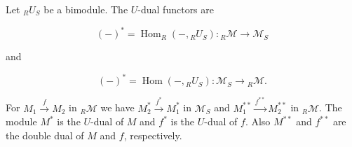 Let ${}_R U_S$ be a bimodule. The $U$-dual functors are

$$(-)^* = \operatorname{Hom}_R(-, {}_R U_S): {}_R\mathcal{M} \to \mathcal{M}_S$$

and

$$(-)^* = \operatorname{Hom}(-, {}_R U_S): \mathcal{M}_S \to {}_R\mathcal{M}.$$

For $M_1 \xrightarrow{f} M_2$ in ${}_R\mathcal{M}$ we have $M_2^* \xrightarrow{f^*} M_1^*$ in $\mathcal{M}_S$ and $M_1^{**} \xrightarrow{f^{**}} M_2^{**}$ in ${}_R\mathcal{M}$. The module $M^*$ is the $U$-dual of $M$ and $f^*$ is the $U$-dual of $f$. Also $M^{**}$ and $f^{**}$ are the double dual of $M$ and $f$, respectively.
